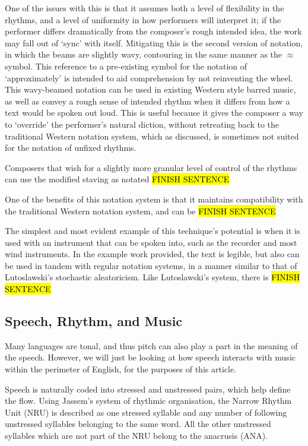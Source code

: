 One of the issues with this is that it assumes both a level of flexibility in the rhythms, and a level of uniformity in how performers will interpret it; if the performer differs dramatically from the composer's rough intended idea, the work may fall out of `sync' with itself.
Mitigating this is the second version of notation, in which the beams are slightly wavy, contouring in the same manner as the \(\approx{}\) symbol. 
This reference to a pre-existing symbol for the notation of `approximately' is intended to aid comprehension by not reinventing the wheel.
This wavy-beamed notation can be used in existing Western style barred music, as well as convey a rough sense of intended rhythm when it differs from how a text would be spoken out loud.
This is useful because it gives the composer a way to `override' the performer's natural diction, without retreating back to the traditional Western notation system, which as discussed, is sometimes not suited for the notation of unfixed rhythms.

Composers that wish for a slightly more granular level of control of the rhythms can use the modified staving as notated \hl{FINISH SENTENCE}

One of the benefits of this notation system is that it maintains compatibility with the traditional Western notation system, and can be \hl{FINISH SENTENCE}

The simplest and most evident example of this technique's potential is when it is used with an instrument that can be spoken into, such as the recorder and most wind instruments. 
In the example work provided, the text is legible, but also can be used in tandem with regular notation systems, in a manner similar to that of Lutoslawski's stochastic aleatoricism.
Like Lutoslawski's system, there is \hl{FINISH SENTENCE}

\subsection{Speech, Rhythm, and Music}
Many languages are tonal, and thus pitch can also play a part in the meaning of the speech. 
However, we will just be looking at how speech interacts with music within the perimeter of English, for the purposes of this article. 

Speech is naturally coded into stressed and unstressed pairs, which help define the flow. 
Using Jassem's system of rhythmic organisation, the Narrow Rhythm Unit (NRU) is described as one stressed syllable and any number of following unstressed syllables belonging to the same word.\autocite[]{hillResultsPreliminaryStudy1977}
All the other unstressed syllables which are not part of the NRU belong to the anacrusis (ANA). 

